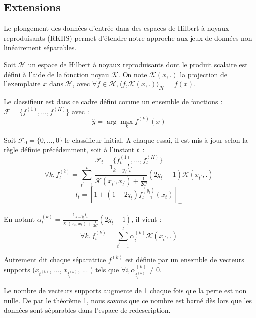 \documentclass[preprint,12pt,authoryear]{elsarticle}
\begin{document}
\subsection{Extensions}
Le plongement des données d'entrée dans des espaces de Hilbert à noyaux reproduisants (RKHS) permet d'étendre notre approche aux jeux de données non linéairement séparables. 

Soit $\mathcal{H}$ un espace de Hilbert à noyaux reproduisants dont le produit scalaire est défini à l'aide de la fonction noyau $\mathcal{K}$. On note $\mathcal{K}(x,.)$ la projection de l'exemplaire $x$ dans $\mathcal{H}$, avec $\forall f \in \mathcal{H}, \langle f,\mathcal{K}(x,.)\rangle_\mathcal{H} = f(x) $.


Le classifieur est dans ce cadre défini comme un ensemble de fonctions : $\mathcal{F} = \{f^{(1)}, ..., f^{(K)}\}$ avec :
$$\hat{y} = \arg \max_k f^{(k)}(x)$$

Soit $\mathcal{F}_0=\{0, ..., 0\}$ le classifieur initial. A chaque essai, il est mis à jour selon la règle définie précédemment, soit à l'instant $t$~:
$$\mathcal{F}_t = \{f^{(1)}_t, ..., f^{(K)}_t\}$$
$$\forall k, f^{(k)}_t = \sum_{t^\prime = 1} ^t  \frac {\mathbf{1}_{k=\tilde{y}_{t^\prime}}l_{t^\prime}}{\mathcal{K}(x_{t^\prime},x_{t^\prime})+\frac{1}{2C}} (2g_{t^\prime} - 1)\mathcal{K}(x_{t^\prime},.)$$
$$ l_t = [1 + (1-2g_t) f_{t-1}^{(\tilde{y}_t)}(x_t)]_+$$

En notant $\alpha_t^{(k)} = \frac {\mathbf{1}_{k=\tilde{y}_{t}}l_{t}}{\mathcal{K}(x_{t},x_{t})+\frac{1}{2C}} (2g_{t} - 1)$, il vient :
$$\forall k, f^{(k)}_t = \sum_{t^\prime = 1} ^t \alpha_{t^\prime}^{(k)} \mathcal{K}(x_{t^\prime},.)$$

Autrement dit chaque séparatrice $f^{(k)}$ est définie par un ensemble de vecteurs supports ($x_{t_1^{(k)}}$, ..., $x_{t_i^{(k)}}$, ...  ) tels que $\forall i, \alpha_{t_i^{(k)}}^{(k)} \neq 0$.


Le nombre de vecteurs supports augmente de 1 chaque fois que la perte est non nulle. De par le théorème 1, nous savons que ce nombre est borné dès lors que les données sont séparables dans l'espace de redescription. 
\end{document}
